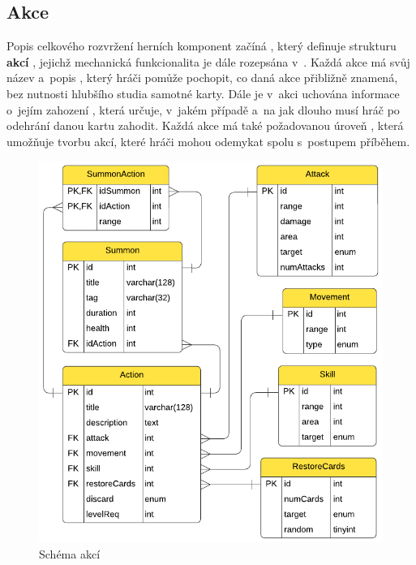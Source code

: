\subsection{Akce}
\label{subsec:schema_actions}

Popis celkového rozvržení herních komponent začíná , který definuje strukturu \textbf{akcí} , jejichž mechanická funkcionalita je dále rozepsána v~. Každá akce má svůj název  a~popis , který hráči pomůže pochopit, co daná akce přibližně znamená, bez nutnosti hlubšího studia samotné karty. Dále je v~akci uchována informace o~jejím zahození , která určuje, v~jakém případě a~na jak dlouho musí hráč po odehrání danou kartu zahodit. Každá akce má také požadovanou úroveň , která umožňuje tvorbu akcí, které hráči mohou odemykat spolu s~postupem příběhem.

\begin{figure}[h]
    \centering
    \includegraphics{../../shared/diagrams/er_action.pdf}
    \caption{Schéma akcí}
    \label{diag:er_action}
\end{figure}

